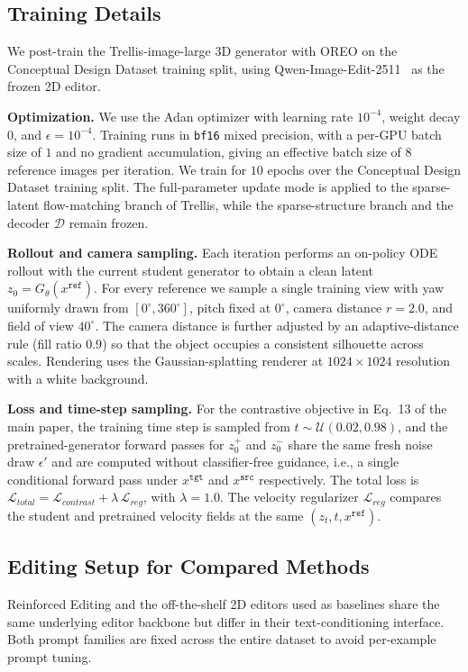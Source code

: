 \documentclass[runningheads]{llncs}
\begin{document}
\subsection{Training Details}
\label{sec:training_details}
We post-train the Trellis-image-large 3D generator with OREO on the Conceptual Design Dataset training split, using Qwen-Image-Edit-2511~\cite{wu2025qwen} as the frozen 2D editor.

\textbf{Optimization.}
We use the Adan optimizer with learning rate $10^{-4}$, weight decay $0$, and $\epsilon=10^{-4}$.
Training runs in \texttt{bf16} mixed precision, with a per-GPU batch size of $1$ and no gradient accumulation, giving an effective batch size of $8$ reference images per iteration.
We train for $10$ epochs over the Conceptual Design Dataset training split.
The full-parameter update mode is applied to the sparse-latent flow-matching branch of Trellis, while the sparse-structure branch and the decoder $\mathcal{D}$ remain frozen.

\textbf{Rollout and camera sampling.}
Each iteration performs an on-policy ODE rollout with the current student generator to obtain a clean latent $z_0 = G_\theta(x^{\texttt{ref}})$.
For every reference we sample a single training view with yaw uniformly drawn from $[0^\circ, 360^\circ]$, pitch fixed at $0^\circ$, camera distance $r=2.0$, and field of view $40^\circ$.
The camera distance is further adjusted by an adaptive-distance rule (fill ratio $0.9$) so that the object occupies a consistent silhouette across scales.
Rendering uses the Gaussian-splatting renderer at $1024\times1024$ resolution with a white background.

\textbf{Loss and time-step sampling.}
For the contrastive objective in Eq.~13 of the main paper, the training time step is sampled from $t \sim \mathcal{U}(0.02, 0.98)$, and the pretrained-generator forward passes for $z_0^{+}$ and $z_0^{-}$ share the same fresh noise draw $\epsilon'$ and are computed without classifier-free guidance, i.e., a single conditional forward pass under $x^{\texttt{tgt}}$ and $x^{\texttt{src}}$ respectively.
The total loss is $\mathcal{L}_{total} = \mathcal{L}_{contrast} + \lambda\,\mathcal{L}_{reg}$, with $\lambda = 1.0$.
The velocity regularizer $\mathcal{L}_{reg}$ compares the student and pretrained velocity fields at the same $(z_t, t, x^{\texttt{ref}})$.

\subsection{Editing Setup for Compared Methods}
\label{sec:editing_setup}
Reinforced Editing and the off-the-shelf 2D editors used as baselines share the same underlying editor backbone but differ in their text-conditioning interface.
Both prompt families are fixed across the entire dataset to avoid per-example prompt tuning.
\end{document}
